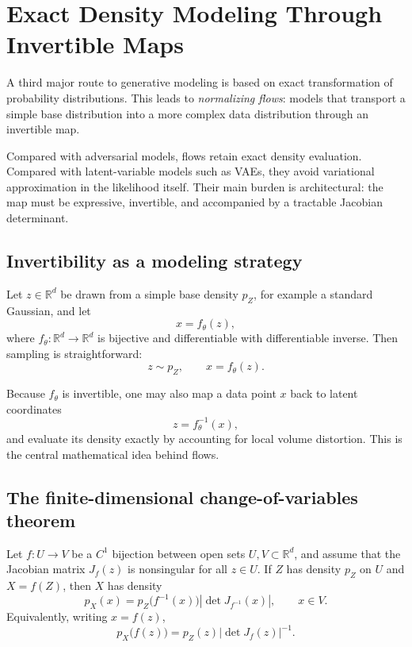 \section{Exact Density Modeling Through Invertible Maps}

A third major route to generative modeling is based on exact transformation of probability distributions.
This leads to \emph{normalizing flows}: models that transport a simple base distribution into a more complex data distribution through an invertible map.

\medskip

Compared with adversarial models, flows retain exact density evaluation.
Compared with latent-variable models such as VAEs, they avoid variational approximation in the likelihood itself.
Their main burden is architectural: the map must be expressive, invertible, and accompanied by a tractable Jacobian determinant.

\subsection*{Invertibility as a modeling strategy}

Let $z\in\mathbb{R}^d$ be drawn from a simple base density $p_Z$, for example a standard Gaussian, and let
\[
x = f_\theta(z),
\]
where $f_\theta:\mathbb{R}^d\to\mathbb{R}^d$ is bijective and differentiable with differentiable inverse.
Then sampling is straightforward:
\[
z\sim p_Z, \qquad x=f_\theta(z).
\]

Because $f_\theta$ is invertible, one may also map a data point $x$ back to latent coordinates
\[
z=f_\theta^{-1}(x),
\]
and evaluate its density exactly by accounting for local volume distortion.
This is the central mathematical idea behind flows.

\subsection*{The finite-dimensional change-of-variables theorem}

\begin{theorem}
Let $f:U\to V$ be a $C^1$ bijection between open sets $U,V\subset \mathbb{R}^d$, and assume that the Jacobian matrix $J_f(z)$ is nonsingular for all $z\in U$.
If $Z$ has density $p_Z$ on $U$ and $X=f(Z)$, then $X$ has density
\[
p_X(x)=p_Z\bigl(f^{-1}(x)\bigr)\left|\det J_{f^{-1}}(x)\right|,
\qquad x\in V.
\]
Equivalently, writing $x=f(z)$,
\[
p_X\bigl(f(z)\bigr)=p_Z(z)\left|\det J_f(z)\right|^{-1}.
\]
\end{theorem}

